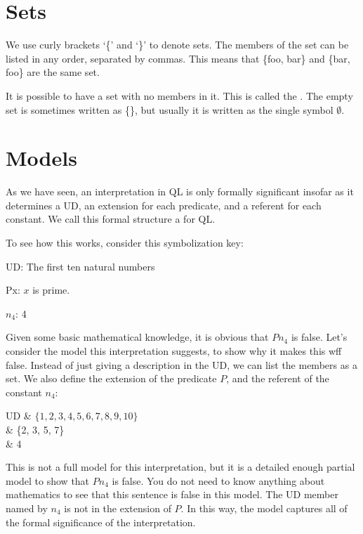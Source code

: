 \section{Sets}

We use curly brackets `\{' and `\}' to denote sets. The members of the set can be listed in any order, separated by commas. This means that \{foo, bar\} and \{bar, foo\} are the same set.

It is possible to have a set with no members in it. This is called the . The empty set is sometimes written as \{\}, but usually it is written as the single symbol $\emptyset$.

\section{Models}
As we have seen, an interpretation in QL is only formally significant insofar as it determines a UD, an extension for each predicate, and a referent for each constant. We call this formal structure a  for QL.

To see how this works, consider this symbolization key:
\begin{ekey}
\item[UD:]The first ten natural numbers
\item[Px:]$x$ is prime.
\item[$n_{4}$:] 4
\end{ekey}

Given some basic mathematical knowledge, it is obvious that $Pn_{4}$ is false. Let's consider the model this interpretation suggests, to show why it makes this wff false. Instead of just giving a description in the UD, we can list the members as a set. We also define the extension of the predicate $P$, and the referent of the constant $n_{4}$:

\begin{partialmodel}
	UD & $\{1, 2, 3, 4, 5, 6, 7, 8, 9, 10\}$\\
	 & \{2, 3, 5, 7\}\\
	 & 4
\end{partialmodel}

This is not a full model for this interpretation, but it is a detailed enough partial model to show that $Pn_{4}$ is false. You do not need to know anything about mathematics to see that this sentence is false in this model. The UD member named by $n_{4}$ is not in the extension of $P$. In this way, the model captures all of the formal significance of the interpretation.

